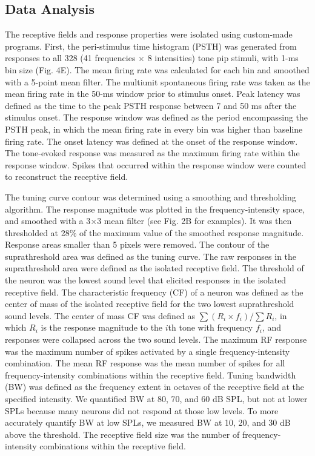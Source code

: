 \subsection{Data Analysis}

The receptive fields and response properties were isolated using custom-made programs. First, the peri-stimulus time histogram (PSTH) was generated from responses to all 328 (41 frequencies $\times$ 8 intensities) tone pip stimuli, with 1-ms bin size (Fig. 4E). The mean firing rate was calculated for each bin and smoothed with a 5-point mean filter. The multiunit spontaneous firing rate was taken as the mean firing rate in the 50-ms window prior to stimulus onset. Peak latency was defined as the time to the peak PSTH response between 7 and 50 ms after the stimulus onset. The response window was defined as the period encompassing the PSTH peak, in which the mean firing rate in every bin was higher than baseline firing rate. The onset latency was defined at the onset of the response window. The tone-evoked response was measured as the maximum firing rate within the response window. Spikes that occurred within the response window were counted to reconstruct the receptive field.

The tuning curve contour was determined using a smoothing and thresholding algorithm. The response magnitude was plotted in the frequency-intensity space, and smoothed with a 3$\times$3 mean filter (see Fig. 2B for examples). It was then thresholded at 28\% of the maximum value of the smoothed response magnitude. Response areas smaller than 5 pixels were removed. The contour of the suprathreshold area was defined as the tuning curve. The raw responses in the suprathreshold area were defined as the isolated receptive field. The threshold of the neuron was the lowest sound level that elicited responses in the isolated receptive field. The characteristic frequency (CF) of a neuron was defined as the center of mass of the isolated receptive field for the two lowest suprathreshold sound levels. The center of mass CF was defined as $\sum{(R_i \times f_i)}/\sum{R_i}$, in which $R_i$ is the response magnitude to the $i$th tone with frequency $f_i$, and responses were collapsed across the two sound levels. The maximum RF response was the maximum number of spikes activated by a single frequency-intensity combination. The mean RF response was the mean number of spikes for all frequency-intensity combinations within the receptive field. Tuning bandwidth (BW) was defined as the frequency extent in octaves of the receptive field at the specified intensity. We quantified BW at 80, 70, and 60 dB SPL, but not at lower SPLs because many neurons did not respond at those low levels. To more accurately quantify BW at low SPLs, we measured BW at 10, 20, and 30 dB above the threshold. The receptive field size was the number of frequency-intensity combinations within the receptive field.

